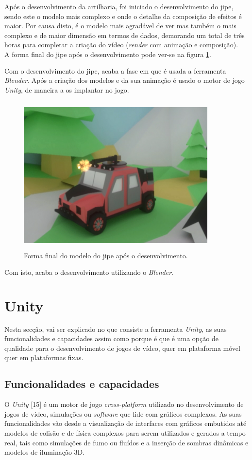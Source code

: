 Após o desenvolvimento da artilharia, foi iniciado o desenvolvimento do jipe, sendo este o modelo mais complexo e onde o detalhe da composição de efeitos é maior. Por causa disto, é o modelo mais agradável de ver mas também o mais complexo e de maior dimensão em termos de dados, demorando um total de três horas para completar a criação do vídeo (\textit{render} com animação e composição). \\

A forma final do jipe após o desenvolvimento pode ver-se na figura \ref{fig:jipe2}.

Com o desenvolvimento do jipe, acaba a fase em que é usada a ferramenta \emph{Blender}. Após a criação dos modelos e da sua animação é usado o motor de jogo \emph{Unity}, de maneira a os implantar no jogo. 

\begin{figure}[!h]
\includegraphics[width=10cm, height=8cm]{model6.png}
  \centering
  \caption{Forma final do modelo do jipe após o desenvolvimento.}
  \label{fig:jipe2}
\end{figure}

Com isto, acaba o desenvolvimento utilizando o \emph{Blender}.
\clearpage
\section{Unity}
\label{chap3:sec:unity}
Nesta secção, vai ser explicado no que consiste a ferramenta \emph{Unity}, as suas funcionalidades e capacidades assim como porque é que é uma opção de qualidade para o desenvolvimento de jogos de vídeo, quer em plataforma móvel quer em plataformas fixas.
\subsection{Funcionalidades e capacidades}
\label{chap3:subsec:funcionalidadesU}
O \emph{Unity} [15] é um motor de jogo \textit{cross-platform} utilizado no desenvolvimento de jogos de vídeo, simulações ou \textit{software} que lide com gráficos complexos. As suas funcionalidades vão desde a visualização de interfaces com gráficos embutidos até modelos de colisão e de física complexos para serem utilizados e gerados a tempo real, tais como simulações de fumo ou fluídos e a inserção de sombras dinâmicas e modelos de iluminação 3D. \\ 

